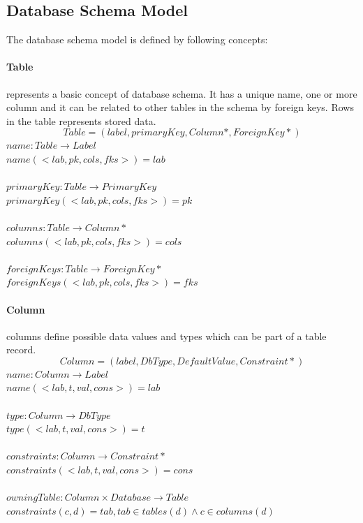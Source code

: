 \documentclass[11pt]{article}
\begin{document}
\subsection{Database Schema Model}
The database schema model is defined by following concepts:
\paragraph{Table} represents a basic concept of database schema. It has a unique name, one or more column and it can be related to other tables in the schema by foreign keys. Rows in the table represents stored data.
$$
Table = (label, primaryKey, Column*, ForeignKey*)
$$
$name : Table \rightarrow Label $ \\
$name(< lab, pk, cols, fks  >) = lab$ \\ \\
$primaryKey : Table \rightarrow PrimaryKey $ \\
$primaryKey(< lab, pk, cols, fks  >) = pk$ \\ \\
$columns : Table \rightarrow Column* $ \\
$columns(< lab, pk, cols, fks  >) = cols$ \\ \\
$foreignKeys : Table \rightarrow ForeignKey* $ \\
$foreignKeys(< lab, pk, cols, fks  >) = fks$ 

\paragraph{Column} columns define possible data values and types which can be part of a table record.
$$
Column = (label, DbType, DefaultValue, Constraint*)
$$
$name : Column \rightarrow Label $ \\
$name(< lab, t, val, cons  >) = lab $ \\ \\
$type : Column \rightarrow DbType $ \\
$type(< lab, t, val, cons  >) = t $ \\ \\
$constraints : Column \rightarrow Constraint* $ \\
$constraints(< lab, t, val, cons  >) = cons $ \\ \\
$owningTable : Column \times Database \rightarrow Table $ \\
$constraints(c, d) = tab, tab \in tables(d) \wedge c \in columns(d) $
\end{document}
